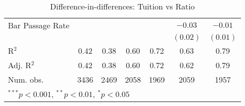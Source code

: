 \begin{table}
\begin{center}
\begin{tabular}{l c c c c c c }
Bar Passage Rate      &               &               &                 &               & $-0.03$       & $-0.01$         \\
                      &               &               &                 &               & $(0.02)$      & $(0.01)$        \\
\hline
R$^2$                 & 0.42          & 0.38          & 0.60            & 0.72          & 0.63          & 0.79            \\
Adj. R$^2$            & 0.42          & 0.38          & 0.60            & 0.72          & 0.62          & 0.79            \\
Num. obs.             & 3436          & 2469          & 2058            & 1969          & 2059          & 1957            \\
\hline
\multicolumn{7}{l}{\scriptsize{$^{***}p<0.001$, $^{**}p<0.01$, $^*p<0.05$}}
\end{tabular}
\caption{Difference-in-differences: Tuition vs Ratio}
\label{tab:tuition-ratio}
\end{center}
\end{table}
\clearpage
